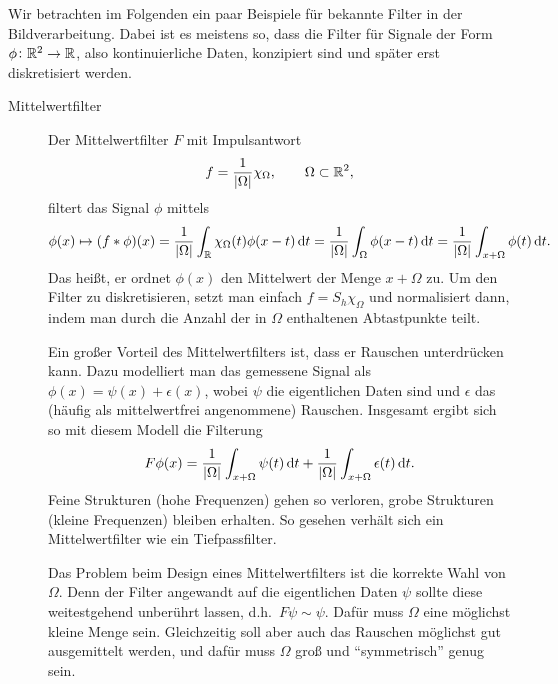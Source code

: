 \begin{example}
Wir betrachten im Folgenden ein paar Beispiele für bekannte Filter in der Bildverarbeitung. Dabei
ist es meistens so, dass die Filter für Signale der Form $ \phi \colon \mathbb{R}^{2} \rightarrow \mathbb{R} $, 
also kontinuierliche Daten, konzipiert sind und später erst diskretisiert werden.
\begin{description}
\item [Mittelwertfilter] Der Mittelwertfilter $ F $ mit Impulsantwort
  \[
    f = \frac{1}{|\Omega|}\chi_{\Omega}, \qquad \Omega \subset \mathbb{R}^{2},
  \]
  filtert das Signal $ \phi $ mittels
  \[
      \phi(x) \mapsto (f * \phi)(x)
    = \frac{1}{|\Omega|} \int_{\R} \chi_{\Omega}(t) \phi(x - t) \dif t
    = \frac{1}{|\Omega|} \int_{\Omega} \phi(x - t) \dif t
    = \frac{1}{|\Omega|} \int_{x + \Omega} \phi(t) \dif t.
  \]
  Das heißt, er ordnet $ \phi(x) $ den Mittelwert der Menge $ x + \Omega $ zu. Um den Filter zu
  diskretisieren, setzt man einfach $ f = S_{h}\chi_{\Omega} $ und normalisiert dann, indem man 
  durch die Anzahl der in $ \Omega $ enthaltenen Abtastpunkte teilt.
  
  Ein großer Vorteil des Mittelwertfilters ist, dass er Rauschen unterdrücken kann. Dazu modelliert
  man das gemessene Signal als $ \phi(x) = \psi(x) + \epsilon(x) $, wobei $ \psi $ die eigentlichen
  Daten sind und $ \epsilon $ das (häufig als mittelwertfrei angenommene) Rauschen. Insgesamt ergibt
  sich so mit diesem Modell die Filterung
  \[
      F\phi (x)
    = \frac{1}{|\Omega|} \int_{x + \Omega} \psi(t) \dif t
        + \frac{1}{|\Omega|} \int_{x + \Omega} \epsilon(t) \dif t.
  \]
  Feine Strukturen (hohe Frequenzen) gehen so verloren, grobe Strukturen (kleine Frequenzen)
  bleiben erhalten. So gesehen verhält sich ein Mittelwertfilter wie ein Tiefpassfilter.
  
  Das Problem beim Design eines Mittelwertfilters ist die korrekte Wahl von $ \Omega $. Denn der 
  Filter angewandt auf die eigentlichen Daten $ \psi $ sollte diese weitestgehend unberührt lassen, 
  d.h.\ $ F\psi \sim \psi $. Dafür muss $ \Omega $ eine möglichst kleine Menge sein. Gleichzeitig 
  soll aber auch das Rauschen möglichst gut ausgemittelt werden, und dafür muss $ \Omega $ groß und
  \enquote{symmetrisch} genug sein.
  

\end{description}
\end{example}
